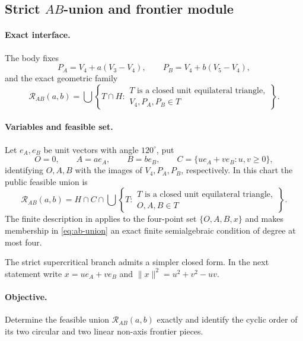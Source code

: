 \subsection{Strict $AB$-union and frontier module}

\paragraph{Exact interface.}
The body fixes
\[
 P_A=V_4+a(V_3-V_4),
 \qquad P_B=V_4+b(V_5-V_4),
\]
and the exact geometric family
\[
 \mathcal R_{AB}(a,b)=
 \bigcup\left\{
 T\cap H:
 \begin{array}{l}
 T\text{ is a closed unit equilateral triangle},\\
 V_4,P_A,P_B\in T
 \end{array}
 \right\}.
\]

\paragraph{Variables and feasible set.}

Let $e_A,e_B$ be unit vectors with angle $120^\circ$, put
\[
 O=0,\qquad A=ae_A,\qquad B=be_B,
 \qquad
 C=\{ue_A+ve_B:u,v\ge0\},
\]
identifying $O,A,B$ with the images of $V_4,P_A,P_B$, respectively.  In
this chart the public feasible union is
\begin{equation}
 \mathcal R_{AB}(a,b)=
 H\cap C\cap
 \bigcup\left\{
 T:
 \begin{array}{l}
 T\text{ is a closed unit equilateral triangle},\\
 O,A,B\in T
 \end{array}
 \right\}.                                   \label{eq:ab-union}
\end{equation}
The finite description in  applies to the
four-point set $\{O,A,B,x\}$ and makes membership in \eqref{eq:ab-union} an
exact finite semialgebraic condition of degree at most four.

The strict supercritical branch admits a simpler closed form.  In the next
statement write $x=ue_A+ve_B$ and
$\lVert x\rVert^2=u^2+v^2-uv$.

\paragraph{Objective.}
Determine the feasible union $\mathcal R_{AB}(a,b)$ exactly and identify the
cyclic order of its two circular and two linear non-axis frontier pieces.

